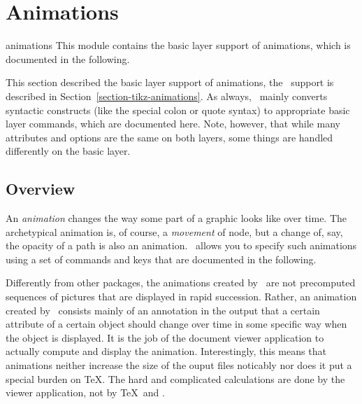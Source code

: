 %
%
%


\section{Animations}

\label{section-base-animations}

\begin{pgfmodule}{animations}
  This module contains the basic layer support of animations, which is
  documented in the following. 
\end{pgfmodule}

This section described the basic layer support of animations, the
\tikzname\ support is described in
Section~\ref{section-tikz-animations}. As always, \tikzname\ mainly
converts syntactic constructs (like the special colon or quote syntax)
to appropriate basic layer commands, which are documented here. Note,
however, that while many attributes and options are the same on both
layers, some things are handled differently on the basic layer.

\subsection{Overview}

An \emph{animation} changes the way some part of a graphic looks like
over time. The archetypical animation is, of course, a \emph{movement}
of node, but a change of, say, the opacity of a path is also an
animation. \pgfname\ allows you to specify such animations using a set
of commands and keys that are documented in the following.

\begin{codeexample}[animation list={0.5,1,1.5,2}]
\end{codeexample}

Differently from other packages, the animations created by \pgfname\ are not
precomputed sequences of pictures that are displayed in rapid
succession. Rather, an animation created by \pgfname\ consists mainly
of an annotation in the output that a certain attribute of a certain
object should change over time in some specific way when the object is
displayed. It is the job of the document viewer application to
actually compute and display the animation. Interestingly, this means
that animations neither increase the size of the ouput files noticably
nor does it put a special burden on \TeX. The hard and complicated
calculations are done by the viewer application, not by \TeX\ and
\pgfname. 

